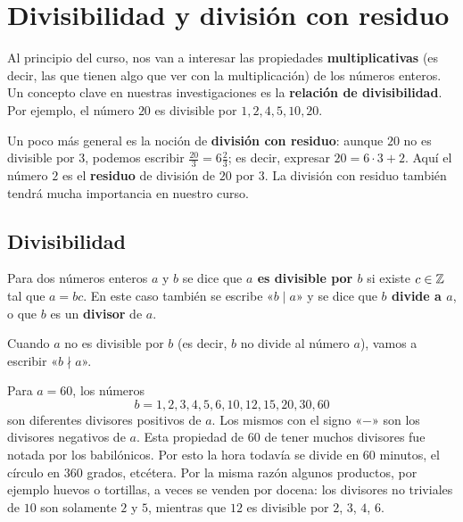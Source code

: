 \chapter{Divisibilidad y división con residuo}
\label{cap:divisibilidad}

Al principio del curso, nos van a interesar las propiedades
\textbf{multiplicativas} (es decir, las que tienen algo que ver con la
multiplicación) de los números enteros. Un concepto clave en nuestras
investigaciones es la \textbf{relación de divisibilidad}. Por ejemplo, el número
$20$ es divisible por $1, 2, 4, 5, 10, 20$.

Un poco más general es la noción de \textbf{división con residuo}: aunque $20$
no es divisible por $3$, podemos escribir $\frac{20}{3} = 6\frac{2}{3}$; es
decir, expresar $20 = 6\cdot 3 + 2$. Aquí el número $2$ es el \textbf{residuo}
de división de $20$ por $3$. La división con residuo también tendrá mucha
importancia en nuestro curso.


\section{Divisibilidad}

\begin{definicion}
  Para dos números enteros $a$ y $b$ se dice que
  \textbf{$a$ es divisible por $b$} si existe $c \in \mathbb{Z}$ tal que $a = bc$.  En
  este caso también se escribe «$b \mid a$» y se dice que
  \textbf{$b$ divide a $a$}, o que $b$ es un \textbf{divisor} de $a$.

  Cuando $a$ no es divisible por $b$ (es decir, $b$ no divide al número $a$),
  vamos a escribir «$b \nmid a$».
\end{definicion}

\begin{ejemplo}
  Para $a = 60$, los números
  $$b = 1, 2, 3, 4, 5, 6, 10, 12, 15, 20, 30, 60$$
  son diferentes divisores positivos de $a$. Los mismos con el signo «$-$» son
  los divisores negativos de $a$. Esta propiedad de $60$ de tener muchos
  divisores fue notada por los babilónicos. Por esto la hora todavía se divide
  en $60$ minutos, el círculo en $360$ grados, etcétera. Por la misma razón
  algunos productos, por ejemplo huevos o tortillas, a veces se venden por
  docena: los divisores no triviales de $10$ son solamente $2$ y $5$, mientras
  que $12$ es divisible por $2$, $3$, $4$, $6$.
\end{ejemplo}

